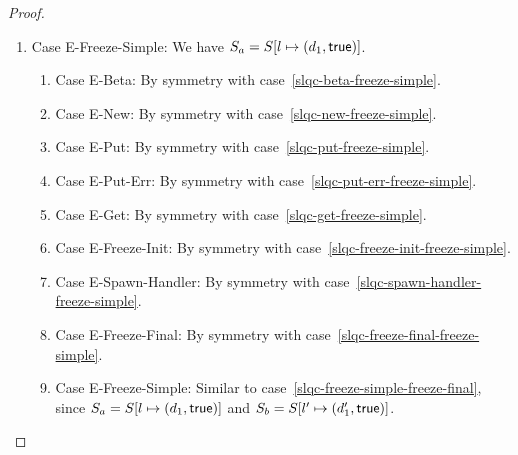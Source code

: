 \begin{proof}
\begin{enumerate}
  \item Case {\sc E-Freeze-Simple}: We have $S_a =
    S[l \mapsto (d_1, \textsf{true})]$.

    \begin{enumerate}
    \item \label{slqc-freeze-simple-beta}Case {\sc E-Beta}: By symmetry with case~\ref{slqc-beta-freeze-simple}.
    \item \label{slqc-freeze-simple-new}Case {\sc E-New}: By symmetry with case~\ref{slqc-new-freeze-simple}.
    \item \label{slqc-freeze-simple-put}Case {\sc E-Put}: By symmetry with case~\ref{slqc-put-freeze-simple}.
    \item \label{slqc-freeze-simple-put-err}Case {\sc E-Put-Err}: By symmetry with case~\ref{slqc-put-err-freeze-simple}.
    \item \label{slqc-freeze-simple-get}Case {\sc E-Get}: By symmetry with case~\ref{slqc-get-freeze-simple}.
    \item \label{slqc-freeze-simple-freeze-init}Case {\sc E-Freeze-Init}: By symmetry with case~\ref{slqc-freeze-init-freeze-simple}.
    \item \label{slqc-freeze-simple-spawn-handler}Case {\sc E-Spawn-Handler}: By symmetry with case~\ref{slqc-spawn-handler-freeze-simple}.
    \item \label{slqc-freeze-simple-freeze-final}Case {\sc E-Freeze-Final}: By symmetry with case~\ref{slqc-freeze-final-freeze-simple}.
    \item \label{slqc-freeze-simple-freeze-simple}Case {\sc
      E-Freeze-Simple}: Similar to
      case~\ref{slqc-freeze-simple-freeze-final}, since $S_a =
      S[l \mapsto (d_1, \textsf{true})]$ and $S_b =
      S[l' \mapsto (d'_1, \textsf{true})]$.
    \end{enumerate}

  \end{enumerate}
\end{proof}

